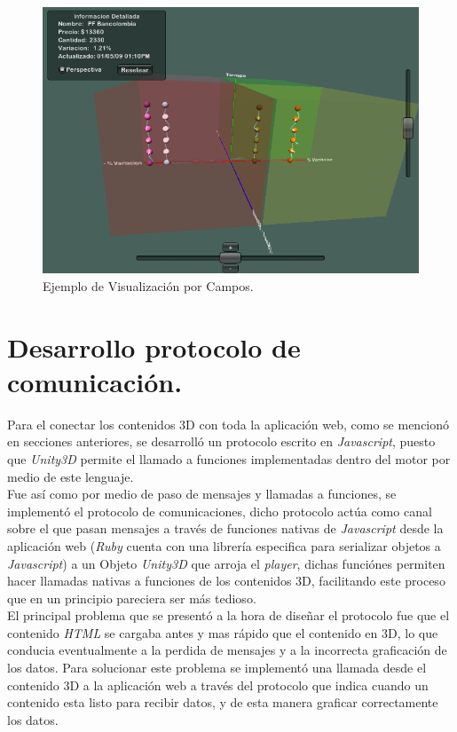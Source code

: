 \begin{figure}[h]
	\centering
		\includegraphics[scale=0.5]{Campo.png}
		\caption{Ejemplo de Visualización por Campos.}
	\label{fig:Campo}
\end{figure}
 

\section{Desarrollo protocolo de comunicación.}

Para el conectar los contenidos 3D con toda la aplicación web, como se mencionó en secciones anteriores, se desarrolló un protocolo escrito en \emph{Javascript}, puesto que \emph{Unity3D} permite el llamado a funciones implementadas dentro del motor por medio de este lenguaje.\\ 

Fue así como por medio de paso de mensajes y llamadas a funciones, se implementó el protocolo de comunicaciones, dicho protocolo actúa como canal sobre el que pasan mensajes a través de funciones nativas de \emph{Javascript} desde la aplicación web (\emph{Ruby} cuenta con una librería especifica para serializar objetos a \emph{Javascript}) a un Objeto \emph{Unity3D} que arroja el \emph{player}, dichas funciónes permiten hacer llamadas nativas a funciones de los contenidos 3D, facilitando este proceso que en un principio pareciera ser más tedioso.\\

El principal problema que se presentó a la hora de diseñar el protocolo fue que el contenido  \emph{HTML} se cargaba antes y mas rápido que el contenido en 3D, lo que conducia eventualmente a la perdida de mensajes y a la incorrecta graficación de los datos. Para solucionar este problema se implementó una llamada desde el contenido 3D a la aplicación web  a través del protocolo que indica cuando un contenido esta listo para recibir datos, y de esta manera graficar correctamente los datos.

